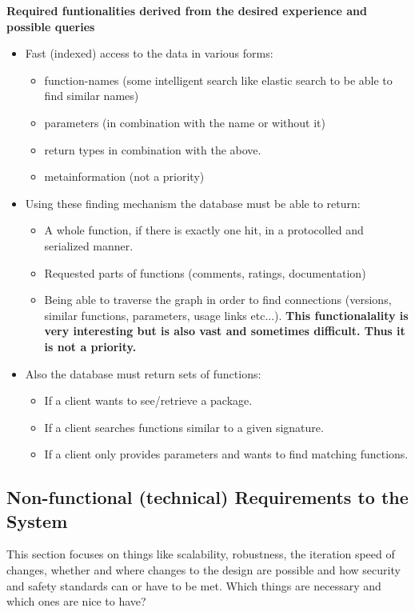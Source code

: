 \documentclass[11p]{scrartcl}
\begin{document}
\textbf{Required funtionalities derived from the desired experience and possible queries}
\begin{itemize}
	\item Fast (indexed) access to the data in various forms:
		\begin{itemize}
			\item function-names (some intelligent search like elastic search to be able to find similar names)
			\item parameters (in combination with the name or without it)
			\item return types in combination with the above.
			\item metainformation (not a priority)
		\end{itemize}		 
	\item Using these finding mechanism the database must be able to return:\
	\begin{itemize}
		\item A whole function, if there is exactly one hit, in a protocolled and serialized manner.
		\item Requested parts of functions (comments, ratings, documentation)
		\item Being able to traverse the graph in order to find connections (versions, similar functions, parameters, usage links etc...). \textbf{This functionalality is very interesting but is also vast and sometimes difficult. Thus it is not a priority.}
	\end{itemize}
	\item Also the database must return sets of functions:
	\begin{itemize}
		\item If a client wants to see/retrieve a package.
		\item If a client searches functions similar to a given signature.
		\item If a client only provides parameters and wants to find matching functions.
	\end{itemize}
\end{itemize}


\subsection{Non-functional (technical) Requirements to the System}
This section focuses on things like scalability, robustness, the iteration speed of changes, whether and where changes to the design are possible and how security and safety standards can or have to be met. Which things are necessary and which ones are nice to have?\\
\end{document}

